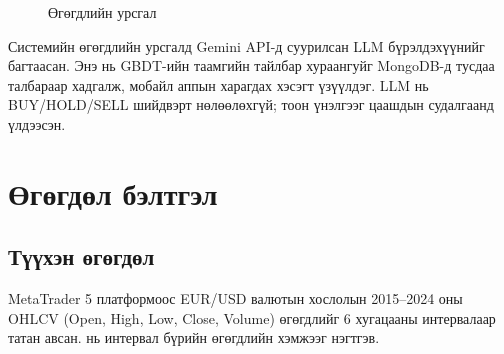 \begin{figure}[H]
{%
}
\caption{Өгөгдлийн урсгал}
\label{fig:data_flow_unified}
\end{figure}

Системийн өгөгдлийн урсгалд Gemini API-д суурилсан LLM бүрэлдэхүүнийг багтаасан. Энэ нь GBDT-ийн таамгийн тайлбар хураангуйг MongoDB-д тусдаа талбараар хадгалж, мобайл аппын харагдах хэсэгт үзүүлдэг. LLM нь BUY/HOLD/SELL шийдвэрт нөлөөлөхгүй; тоон үнэлгээг цаашдын судалгаанд үлдээсэн.
\section{Өгөгдөл бэлтгэл}

\subsection{Түүхэн өгөгдөл}

MetaTrader 5 платформоос EUR/USD валютын хослолын 2015--2024 оны OHLCV (Open, High, Low, Close, Volume) өгөгдлийг 6 хугацааны интервалаар татан авсан.  нь интервал бүрийн өгөгдлийн хэмжээг нэгтгэв.

